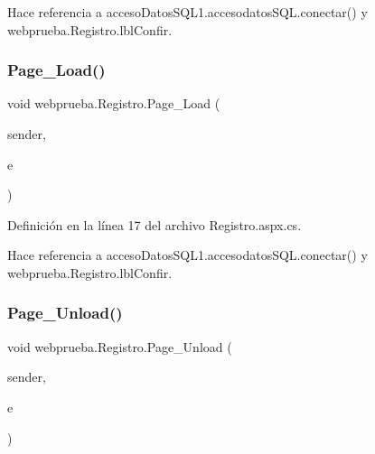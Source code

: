 Hace referencia a acceso\+Datos\+S\+Q\+L1.\+accesodatos\+S\+Q\+L.\+conectar() y webprueba.\+Registro.\+lbl\+Confir.

\mbox{\label{classwebprueba_1_1_registro_a8cbcc641cfa3625b90acc4d223169a45}} 
\subsubsection{\texorpdfstring{Page\_Load()}{Page\_Load()}\hspace{0.1cm}{\footnotesize\ttfamily [2/2]}}
{\footnotesize\ttfamily void webprueba.\+Registro.\+Page\+\_\+\+Load (\begin{DoxyParamCaption}\item[{object}]{sender,  }\item[{Event\+Args}]{e }\end{DoxyParamCaption})\hspace{0.3cm}{\ttfamily [protected]}}



Definición en la línea 17 del archivo Registro.\+aspx.\+cs.


\begin{DoxyCode}{0}

\end{DoxyCode}


Hace referencia a acceso\+Datos\+S\+Q\+L1.\+accesodatos\+S\+Q\+L.\+conectar() y webprueba.\+Registro.\+lbl\+Confir.

\mbox{\label{classwebprueba_1_1_registro_a55b248cd28e6482085487d8a1d7cee0e}} 
\subsubsection{\texorpdfstring{Page\_Unload()}{Page\_Unload()}\hspace{0.1cm}{\footnotesize\ttfamily [1/2]}}
{\footnotesize\ttfamily void webprueba.\+Registro.\+Page\+\_\+\+Unload (\begin{DoxyParamCaption}\item[{object}]{sender,  }\item[{Event\+Args}]{e }\end{DoxyParamCaption})\hspace{0.3cm}{\ttfamily [protected]}}



